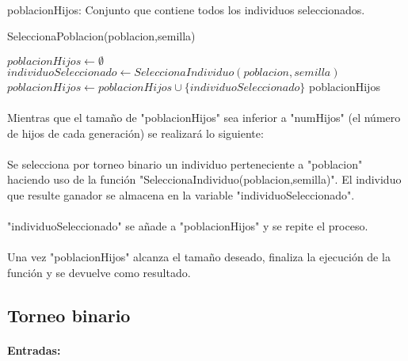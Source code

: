 	\paragraph{}poblacionHijos: Conjunto que contiene todos los individuos seleccionados.

	\begin{algorithm}[H]
		\caption{SeleccionaPoblacion(poblacion,semilla)}
		\begin{algorithmic}
			\STATE $poblacionHijos \leftarrow \emptyset$
			\STATE $individuoSeleccionado \leftarrow SeleccionaIndividuo(poblacion,semilla)$
			\STATE $poblacionHijos \leftarrow poblacionHijos\cup\{individuoSeleccionado\}$
			\ENDWHILE
			\RETURN poblacionHijos
		\end{algorithmic}
	\end{algorithm}

	\paragraph{}Mientras que el tamaño de "poblacionHijos" sea inferior a "numHijos" (el número de hijos de cada generación) se realizará lo siguiente:
	
	\paragraph{} Se selecciona por torneo binario un individuo perteneciente a "poblacion" haciendo uso de la función "SeleccionaIndividuo(poblacion,semilla)". El individuo que resulte ganador se almacena en la variable "individuoSeleccionado".
	
	\paragraph{}"individuoSeleccionado" se añade a "poblacionHijos" y se repite el proceso.
	
	\paragraph{}Una vez "poblacionHijos" alcanza el tamaño deseado, finaliza la ejecución de la función y se devuelve como resultado.
	
	\subsection{Torneo binario}
	
	\paragraph{Entradas:}
	
